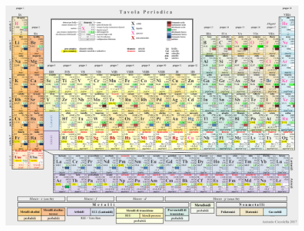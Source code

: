 \documentclass[openany,12pt]{book}%
\newcommand\blankpage{%
    \null
    \thispagestyle{empty}%
    \newpage}
\begin{document}
\begin{figure}[H]
    \includegraphics[angle=90,origin=c]{immagini/tavola periodica.png}
\end{figure}


\afterpage{\blankpage}
\end{document}
